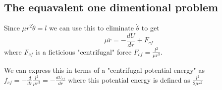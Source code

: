 \documentclass{homework}
\begin{document}
\subsection{The equavalent one dimentional problem}

Since $\mu r^2\dot{\theta} = l$ we can use this to eliminate $\dot{\theta}$ to get
\[\mu\ddot{r} =- \frac{dU}{dr} + F_{cf} \]
where $F_{cf}$ is a ficticious "centrifugal" force $F_{cf} = \frac{l^2}{\mu r^3}$. 



We can express this in terms of a "centrifugal potential energy" as $f_{cf} = -\frac{d}{dr}\frac{l^2}{\mu r^3} = -\frac{dU_{cf}}{dr}$ where this potential energy is defined as $\frac{l^2}{2\mu r^2}$
\end{document}
